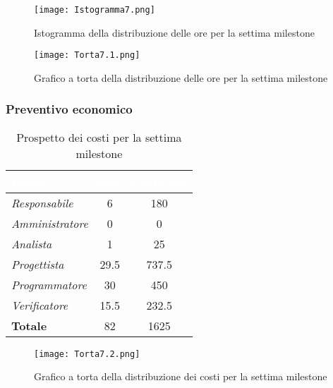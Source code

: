 \begin{figure}[H]
    \texttt{[image: Istogramma7.png]}
    \caption{Istogramma della distribuzione delle ore per la settima milestone}
\end{figure}

\begin{figure}[H]
    \texttt{[image: Torta7.1.png]}
    \caption{Grafico a torta della distribuzione delle ore per la settima milestone}
\end{figure}

\newpage
\subsubsection{Preventivo economico}

\begin{table}[H]
    \renewcommand\arraystretch{1.5}
    \centering
    \begin{tabular}{|l|c|c|}
    \hline
    \rowcolor[HTML]{036400}
    \textcolor{white}{\textbf{Ruolo}} & \multicolumn{1}{l|}{\textcolor{white}{\textbf{Ore}}} & \multicolumn{1}{l|}{\textcolor{white}{\textbf{Costo (€)}}} \\ \hline
    \rowcolor[HTML]{EFEFEF}\textit{Responsabile}   & 6    & 180     \\ \hline
    \rowcolor[HTML]{C0C0C0}\textit{Amministratore} & 0  & 0     \\ \hline
    \rowcolor[HTML]{EFEFEF}\textit{Analista}       & 1    & 25     \\ \hline
    \rowcolor[HTML]{C0C0C0}\textit{Progettista}    & 29.5 & 737.5  \\ \hline
    \rowcolor[HTML]{EFEFEF}\textit{Programmatore}  & 30 & 450  \\ \hline
    \rowcolor[HTML]{C0C0C0}\textit{Verificatore}   & 15.5 & 232.5  \\ \hline
    \rowcolor[HTML]{EFEFEF}\textbf{Totale}         & 82   & 1625  \\ \hline
    \end{tabular}
    \caption{Prospetto dei costi per la settima milestone}
\end{table}

\begin{figure}[H]
    \texttt{[image: Torta7.2.png]}
    \caption{Grafico a torta della distribuzione dei costi per la settima milestone}
\end{figure}



